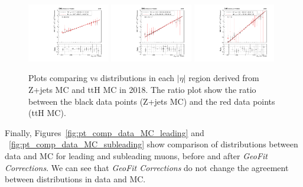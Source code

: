 \begin{figure}[h!]
    \centering
    \includegraphics[width=0.32\textwidth]{images_geofit/ttH_eta_0_0p9_2018.pdf}
    \includegraphics[width=0.32\textwidth]{images_geofit/ttH_eta_0p9_1p7_2018.pdf}
    \includegraphics[width=0.32\textwidth]{images_geofit/ttH_eta_1p7_inf_2018.pdf}
    \caption{Plots comparing \dptoverptsquare vs \dzeroBS distributions in each $|\eta|$ region derived from Z+jets MC and ttH MC in 2018. The ratio plot show the ratio between the black data points (Z+jets MC) and the red data points (ttH MC).}
    \label{fig:ttH_d0_2018}
\end{figure}

Finally, Figures~\ref{fig:pt_comp_data_MC_leading} and ~\ref{fig:pt_comp_data_MC_subleading} show comparison of \pt distributions between data and MC for leading and subleading muons, before and after \textit{GeoFit Corrections}. We can see that \textit{GeoFit Corrections} do not change the agreement between \pt distributions in data and MC.

